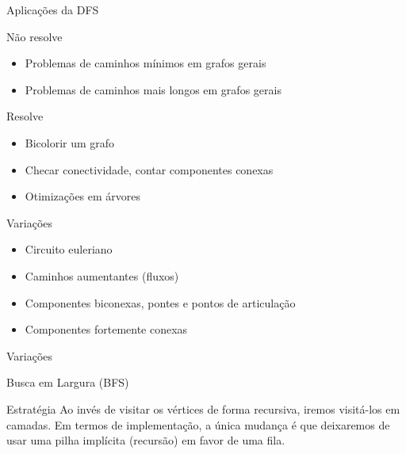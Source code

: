 \begin{frame}{Aplicações da DFS}
\begin{block}{Não resolve}
    \begin{itemize}
        \item Problemas de caminhos mínimos em grafos gerais
        \item Problemas de caminhos mais longos em grafos gerais
    \end{itemize}
\end{block}

\begin{block}{Resolve}
    \begin{itemize}
        \item Bicolorir um grafo
        \item Checar conectividade, contar componentes conexas
        \item Otimizações em árvores
    \end{itemize}
\end{block}

\begin{block}{Variações}
    \begin{itemize}
        \item Circuito euleriano
        \item Caminhos aumentantes (fluxos)
        \item Componentes biconexas, pontes e pontos de articulação
        \item Componentes fortemente conexas
    \end{itemize}
\end{block}
\end{frame}

\begin{frame}{Variações}
\end{frame}


\begin{frame}{Busca em Largura (BFS)}
\begin{block}{Estratégia}
Ao invés de visitar os vértices de forma recursiva, iremos visitá-los em camadas. Em termos de implementação, a única mudança é que deixaremos de usar uma pilha implícita (recursão) em favor de uma fila.
\end{block}
\end{frame}

